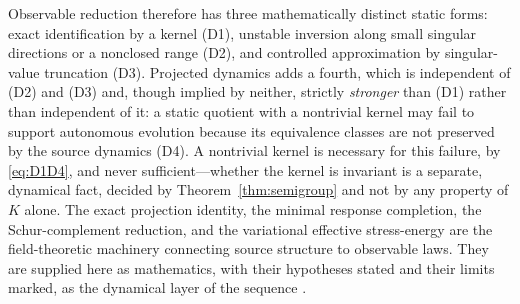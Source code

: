\documentclass[11pt,reqno]{amsart}
\numberwithin{equation}{section}
\theoremstyle{plain}
\theoremstyle{definition}
\theoremstyle{remark}
\begin{document}
Observable reduction therefore has three mathematically distinct static forms: exact
identification by a kernel (D1), unstable inversion along small singular directions or a
nonclosed range (D2), and controlled approximation by singular-value truncation (D3).
Projected dynamics adds a fourth, which is independent of (D2) and (D3) and, though implied by
neither, strictly \emph{stronger} than (D1) rather than independent of it: a static quotient
with a nontrivial kernel may fail to support autonomous evolution because its equivalence
classes are not preserved by the source dynamics (D4). A nontrivial kernel is necessary for
this failure, by \eqref{eq:D1D4}, and never sufficient---whether the kernel is invariant is a
separate, dynamical fact, decided by Theorem~\ref{thm:semigroup} and not by any property of
$K$ alone. The exact projection identity, the minimal response completion, the
Schur-complement reduction, and the variational effective stress-energy are the field-theoretic
machinery connecting source structure to observable laws. They are supplied here as
mathematics, with their hypotheses stated and their limits marked, as the dynamical layer of
the sequence \cite{Paper1,Paper2,Paper3,Paper4}.
\end{document}
